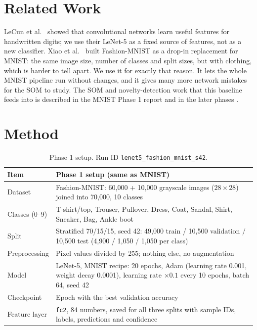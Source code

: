 \documentclass[11pt]{article}
\begin{document}
\section{Related Work}

LeCun et al.~\cite{lecun1998gradient} showed that convolutional networks learn useful features for handwritten digits; we use their LeNet-5 as a fixed source of features, not as a new classifier. Xiao et al.~\cite{xiao2017fashion} built Fashion-MNIST as a drop-in replacement for MNIST: the same image size, number of classes and split sizes, but with clothing, which is harder to tell apart. We use it for exactly that reason. It lets the whole MNIST pipeline run without changes, and it gives many more network mistakes for the SOM to study. The SOM and novelty-detection work that this baseline feeds into is described in the MNIST Phase 1 report and in the later phases \cite{kohonen1990som,jafari_nnsom}.

\section{Method}\label{sec:method}

\begin{table}[H]
\centering
\renewcommand{\arraystretch}{1.10}
\begin{tabular}{|p{}|p{}|}
\hline
\textbf{Item} & \textbf{Phase 1 setup (same as MNIST)} \\ \hline
Dataset & Fashion-MNIST: 60,000 + 10,000 grayscale images ($28\times28$) joined into 70,000, 10 classes \\ \hline
Classes (0--9) & T-shirt/top, Trouser, Pullover, Dress, Coat, Sandal, Shirt, Sneaker, Bag, Ankle boot \\ \hline
Split & Stratified 70/15/15, seed 42: 49,000 train / 10,500 validation / 10,500 test (4,900 / 1,050 / 1,050 per class) \\ \hline
Preprocessing & Pixel values divided by 255; nothing else, no augmentation \\ \hline
Model & LeNet-5, MNIST recipe: 20 epochs, Adam (learning rate 0.001, weight decay 0.0001), learning rate $\times0.1$ every 10 epochs, batch 64, seed 42 \\ \hline
Checkpoint & Epoch with the best validation accuracy \\ \hline
Feature layer & \texttt{fc2}, 84 numbers, saved for all three splits with sample IDs, labels, predictions and confidence \\ \hline
\end{tabular}
\caption{Phase 1 setup. Run ID \texttt{lenet5\_fashion\_mnist\_s42}.}
\end{table}
\end{document}
